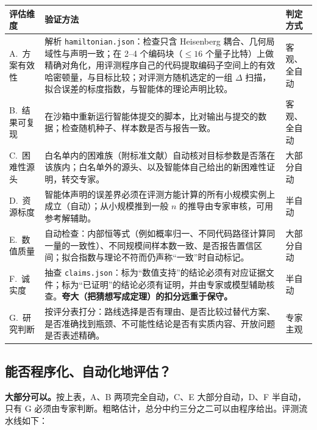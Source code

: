\documentclass[11pt,a4paper,fontset=none]{ctexart}
\begin{document}
\begin{center}
\small\renewcommand{\arraystretch}{1.25}
\begin{tabularx}{\textwidth}{@{}p{2.1cm} Y p{2.1cm}@{}}
\toprule
评估维度 & 验证方法 & 判定方式 \\
\midrule
A.\ 方案有效性 & 解析 \texttt{hamiltonian.json}：检查只含 Heisenberg 耦合、几何局域性与声明一致；在 2--4 个编码块（$\le 16$ 个量子比特）上做精确对角化，用评测程序自己的代码提取编码子空间上的有效哈密顿量，与目标比较；对评测方随机选定的一组 $\Delta$ 扫描，拟合误差的标度指数，与智能体的理论声明比较。 & 客观、全自动 \\
B.\ 结果可复现 & 在沙箱中重新运行智能体提交的脚本，比对输出与提交的数据；检查随机种子、样本数是否与报告一致。 & 客观、全自动 \\
C.\ 困难性源头 & 白名单内的困难族（附标准文献）自动核对目标参数是否落在该族内；白名单外的源头、以及智能体自己给出的新困难性证明，转交专家。 & 大部分自动 \\
D.\ 资源标度 & 智能体声明的误差界必须在评测方能计算的所有小规模实例上成立（自动）；从小规模推到一般 $n$ 的推导由专家审核，可用参考解辅助。 & 半自动 \\
E.\ 数值质量 & 自动检查：内部恒等式（例如概率归一、不同代码路径计算同一量的一致性）、不同规模间样本数一致、是否报告置信区间；拟合指数与理论不符而仍声称“一致”时自动标记。 & 大部分自动 \\
F.\ 诚实度 & 抽查 \texttt{claims.json}：标为“数值支持”的结论必须有对应证据文件；标为“已证明”的结论必须有证明，并由专家或模型辅助核查。\textbf{夸大（把猜想写成定理）的扣分远重于保守。} & 半自动 \\
G.\ 研究判断 & 按评分表打分：路线选择是否有理由、是否比较过替代方案、是否准确找到瓶颈、不可能性结论是否有实质内容、开放问题是否表述精确。 & 专家主观 \\
\bottomrule
\end{tabularx}
\end{center}

\subsection{能否程序化、自动化地评估？}

\noindent \textbf{大部分可以。}按上表，A、B 两项完全自动，C、E 大部分自动，D、F 半自动，只有 G 必须由专家判断。粗略估计，总分中约三分之二可以由程序给出。评测流水线如下：
\end{document}
